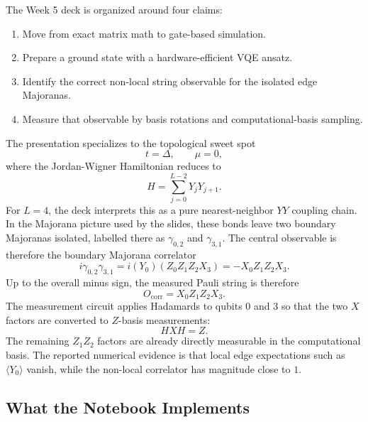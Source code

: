 \documentclass[11pt]{article}
\begin{document}
The Week 5 deck is organized around four claims:
\begin{enumerate}
  \item Move from exact matrix math to gate-based simulation.
  \item Prepare a ground state with a hardware-efficient VQE ansatz.
  \item Identify the correct non-local string observable for the isolated edge
        Majoranas.
  \item Measure that observable by basis rotations and computational-basis
        sampling.
\end{enumerate}

The presentation specializes to the topological sweet spot
\begin{equation}
  t=\Delta,\qquad \mu=0,
\end{equation}
where the Jordan-Wigner Hamiltonian reduces to
\begin{equation}
  H = \sum_{j=0}^{L-2} Y_jY_{j+1}.
\end{equation}
For $L=4$, the deck interprets this as a pure nearest-neighbor $YY$ coupling
chain. In the Majorana picture used by the slides, these bonds leave two
boundary Majoranas isolated, labelled there as $\gamma_{0,2}$ and
$\gamma_{3,1}$. The central observable is therefore the boundary Majorana
correlator
\begin{equation}
  i\gamma_{0,2}\gamma_{3,1}
  = i(Y_0)(Z_0Z_1Z_2X_3)
  = -X_0Z_1Z_2X_3.
\end{equation}
Up to the overall minus sign, the measured Pauli string is therefore
\begin{equation}
  O_{\mathrm{corr}} = X_0Z_1Z_2X_3.
\end{equation}
The measurement circuit applies Hadamards to qubits $0$ and $3$ so that the two
$X$ factors are converted to $Z$-basis measurements:
\begin{equation}
  H X H = Z.
\end{equation}
The remaining $Z_1Z_2$ factors are already directly measurable in the
computational basis. The reported numerical evidence is that local edge
expectations such as $\langle Y_0\rangle$ vanish, while the non-local
correlator has magnitude close to $1$.

\subsection{What the Notebook Implements}
\end{document}
